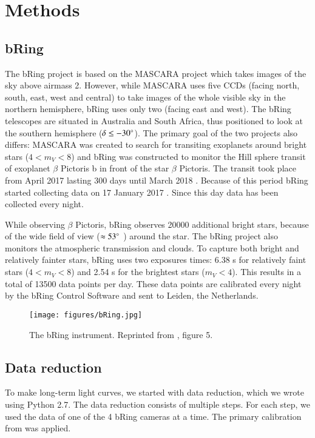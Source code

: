 \documentclass[onecolumn]{aa} %
\begin{document}
\section{Methods}
\label{sec:methods}
\subsection{bRing}
The bRing project is based on the MASCARA project \citep{mascara} which takes images of the sky above airmass 2. However, while MASCARA uses five CCDs (facing north, south, east, west and central) to take images of the whole visible sky in the northern hemisphere, bRing uses only two (facing east and west). The bRing telescopes are situated in Australia and South Africa, thus positioned to look at the southern hemisphere ($\delta \leq -30 ^\circ $). The primary goal of the two projects also differs: MASCARA was created to search for transiting exoplanets around bright stars ($4 < m_V < 8$) and bRing was constructed to monitor the Hill sphere transit of exoplanet $\beta$ Pictoris b in front of the star $\beta$ Pictoris. The transit took place from April 2017 lasting 300 days until March 2018 \citep{Wang_2016}. Because of this period bRing started collecting data on 17 January 2017 \citep{bring}. Since this day data has been collected every night.

While observing $\beta$ Pictoris, bRing observes 20000 additional bright stars, because of the wide field of view ($\approx 53^\circ$ ) around the star. The bRing project also monitors the atmospheric transmission and clouds. To capture both bright and relatively fainter stars, bRing uses two exposures times: 6.38 s for relatively faint stars ($4 < m_V < 8$) and 2.54 s for the brightest stars ($m_V < 4$). This results in a total of 13500 data points per day. These data points are calibrated every night by the bRing Control Software and sent to Leiden, the Netherlands.

\begin{figure}
    \centering
    \texttt{[image: figures/bRing.jpg]}
    \caption{The bRing instrument. Reprinted from \cite{bring}, figure 5.}
    \label{bRing}
\end{figure}


\subsection{Data reduction}
To make long-term light curves, we started with data reduction, which we wrote using Python 2.7.
The data reduction consists of multiple steps. For each step, we used the data of one of the 4 bRing cameras at a time. The primary calibration from \cite{Talens_2018} was applied.
\end{document}

